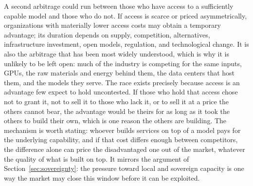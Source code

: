 \documentclass[10pt,oneside,openany]{book}
\begin{document}
\begin{notebox}
A second arbitrage could run between those who have access to a sufficiently capable model and those who do not. If access is scarce or priced asymmetrically, organizations with materially lower access costs may obtain a temporary advantage; its duration depends on supply, competition, alternatives, infrastructure investment, open models, regulation, and technological change. It is also the arbitrage that has been most widely understood, which is why it is unlikely to be left open: much of the industry is competing for the same inputs, GPUs, the raw materials and energy behind them, the data centers that host them, and the models they serve. The race exists precisely because access is an advantage few expect to hold uncontested. If those who hold that access chose not to grant it, not to sell it to those who lack it, or to sell it at a price the others cannot bear, the advantage would be theirs for as long as it took the others to build their own, which is one reason the others are building. The mechanism is worth stating: whoever builds services on top of a model pays for the underlying capability, and if that cost differs enough between competitors, the difference alone can price the disadvantaged one out of the market, whatever the quality of what is built on top. It mirrors the argument of Section~\ref{sec:sovereignty}: the pressure toward local and sovereign capacity is one way the market may close this window before it can be exploited.
\end{notebox}
\end{document}
